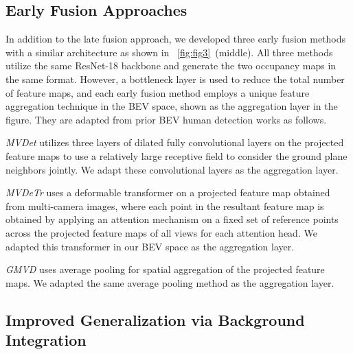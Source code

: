 \subsection{Early Fusion Approaches}

In addition to the late fusion approach, we developed three early fusion methods with a similar architecture as shown in \figureautorefname~\ref{fig:fig3}~(middle). All three methods utilize the same ResNet-18 backbone and generate the two occupancy maps in the same format. However, a bottleneck layer is used to reduce the total number of feature maps, and each early fusion method employs a unique feature aggregation technique in the BEV space, shown as the aggregation layer in the figure. They are adapted from prior BEV human detection works as follows.

\textit{MVDet} \cite{hou2020multiview} utilizes three layers of dilated fully convolutional layers on the projected feature maps to use a relatively large receptive field to consider the ground plane neighbors jointly. We adapt these convolutional layers as the aggregation layer.

\textit{MVDeTr} \cite{hou2021multiview} uses a deformable transformer on a projected feature map obtained from multi-camera images, where each point in the resultant feature map is obtained by applying an attention mechanism on a fixed set of reference points across the projected feature maps of all views for each attention head. We adapted this transformer in our BEV space as the aggregation layer.

\textit{GMVD} \cite{vora2023bringing} uses average pooling for spatial aggregation of the projected feature maps. We adapted the same average pooling method as the aggregation layer.

\subsection{Improved Generalization via Background Integration}

